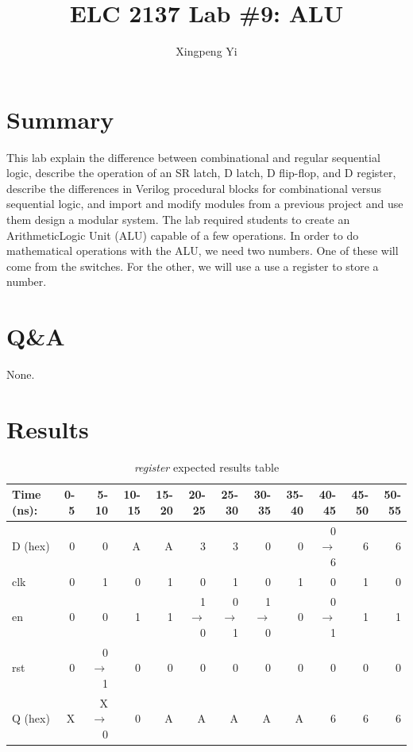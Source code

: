 \documentclass[11pt]{article}
\begin{document}
\title{ELC 2137 Lab \#9: ALU}
\author{Xingpeng Yi}

\maketitle


\section*{Summary}

This lab explain the difference between combinational and regular sequential logic, describe the operation of an SR latch, D latch, D flip-flop, and D register, describe the differences in Verilog procedural blocks for combinational versus sequential logic, and import and modify modules from a previous project and use them  design a modular system. The lab required students to create an ArithmeticLogic Unit (ALU) capable of a few operations. In order to do mathematical operations with the ALU, we need two numbers. One of these will come from the switches. For the other, we will use a use a register to store a number.


\section*{Q\&A}
None.
\section*{Results}


\begin{table}[ht]\centering
	\caption{\textit{register} expected results table}
	\label{ALU:tbl:register_ERT}\medskip
	\begin{tabular}{l|rrrrrrrrrrr}
		Time (ns): & 0-5 & 5-10 & 10-15 & 15-20 & 20-25 & 25-30 & 30-35 & 35-40 & 40-45 & 45-50 & 50-55 \\
		\midrule
		D (hex) & 0 & 0 & A & A & 3 & 3 & 0 & 0 & 0$\to$6 & 6 & 6 \\
		clk        & 0 & 1 & 0 & 1 & 0 & 1 & 0 & 1 & 0 & 1 & 0 \\
		en  	& 0 & 0 & 1 & 1 & 1$\to$0 & 0$\to$1 & 1$\to$0 & 0 & 0$\to$1 & 1 & 1 \\
		rst 	& 0 & 0$\to$1 & 0 & 0 & 0 & 0 & 0 & 0 & 0 & 0 & 0 \\
		\midrule
		Q (hex) & X & X$\to$0 & 0 & A & A & A & A & A & 6 & 6 & 6 \\
		\bottomrule
	\end{tabular}
\end{table}
\end{document}
